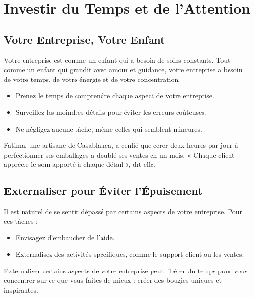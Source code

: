 \documentclass[11pt,fleqn,onecolumn,oneside]{book}
\begin{document}
\section{Investir du Temps et de l’Attention}

\subsection*{Votre Entreprise, Votre Enfant}

Votre entreprise est comme un enfant qui a besoin de soins constants. Tout comme un enfant qui grandit avec amour et guidance, votre entreprise a besoin de votre temps, de votre énergie et de votre concentration.

\begin{itemize}
    \item Prenez le temps de comprendre chaque aspect de votre entreprise.
    \item Surveillez les moindres détails pour éviter les erreurs coûteuses.
    \item Ne négligez aucune tâche, même celles qui semblent mineures.
\end{itemize}

\begin{example}
Fatima, une artisane de Casablanca, a confié que ccrer deux heures par jour à perfectionner ses emballages a doublé ses ventes en un mois. « Chaque client apprécie le soin apporté à chaque détail », dit-elle.
\end{example}

\subsection*{Externaliser pour Éviter l’Épuisement}

Il est naturel de se sentir dépassé par certains aspects de votre entreprise. Pour ces tâches :
\begin{itemize}
    \item Envisagez d’embaucher de l’aide.
    \item Externalisez des activités spécifiques, comme le support client ou les ventes.
\end{itemize}

\begin{remark}
Externaliser certains aspects de votre entreprise peut libérer du temps pour vous concentrer sur ce que vous faites de mieux : créer des bougies uniques et inspirantes.
\end{remark}
\end{document}
